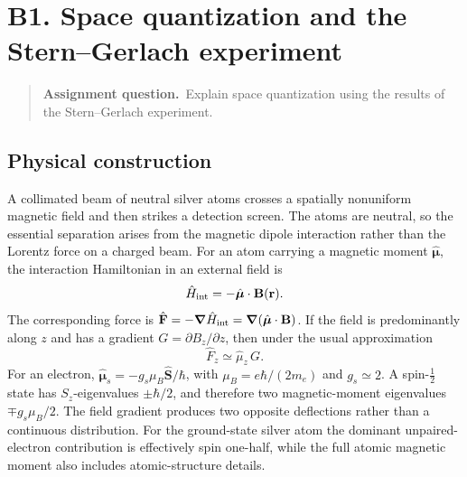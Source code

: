 \documentclass[11pt,a4paper]{article}
\theoremstyle{definition}
\newcommand{\grad}{\boldsymbol\nabla}
\newenvironment{question}{\begin{quote}\small\noindent\textbf{Assignment question.}\ }{\end{quote}}
\begin{document}
\section{B1. Space quantization and the Stern--Gerlach experiment}
\begin{question}Explain space quantization using the results of the Stern--Gerlach experiment.\end{question}
\subsection{Physical construction}
A collimated beam of neutral silver atoms crosses a spatially nonuniform magnetic field and then strikes a detection screen. The atoms are neutral, so the essential separation arises from the magnetic dipole interaction rather than the Lorentz force on a charged beam. For an atom carrying a magnetic moment \(\hat{\bm\mu}\), the interaction Hamiltonian in an external field is
\begin{equation}
\hat H_{\rm int}=-\hat{\bm\mu}\cdot\mathbf B(\mathbf r).
\label{eq:SGH}
\end{equation}
The corresponding force is \(\hat{\mathbf F}=-\grad\hat H_{\rm int}=\grad(\hat{\bm\mu}\cdot\mathbf B)\). If the field is predominantly along \(z\) and has a gradient \(G=\partial B_z/\partial z\), then under the usual approximation
\begin{equation}
\hat F_z\simeq\hat\mu_z\,G.
\end{equation}
For an electron, \(\hat{\bm\mu}_s=-g_s\mu_B\hat{\mathbf S}/\hbar\), with \(\mu_B=e\hbar/(2m_e)\) and \(g_s\simeq2\). A spin-\(\frac12\) state has \(S_z\)-eigenvalues \(\pm\hbar/2\), and therefore two magnetic-moment eigenvalues \(\mp g_s\mu_B/2\). The field gradient produces two opposite deflections rather than a continuous distribution. For the ground-state silver atom the dominant unpaired-electron contribution is effectively spin one-half, while the full atomic magnetic moment also includes atomic-structure details.
\begin{center}
\end{center}
\end{document}
